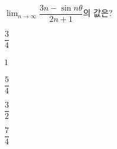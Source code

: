 $\displaystyle\lim_{n\to\infty}\dfrac{3n-\sin n\theta}{2n+1}$의 값은? 
\begin{choices32}{\rule[-3ex]{0pt}{8ex}$\dfrac{3}{4}$}{\rule[-3ex]{0pt}{8ex}$1$}{\rule[-3ex]{0pt}{8ex}$\dfrac{5}{4}$}{\rule[-3ex]{0pt}{8ex}$\dfrac{3}{2}$}{\rule[-3ex]{0pt}{8ex}$\dfrac{7}{4}$}\end{choices32}
